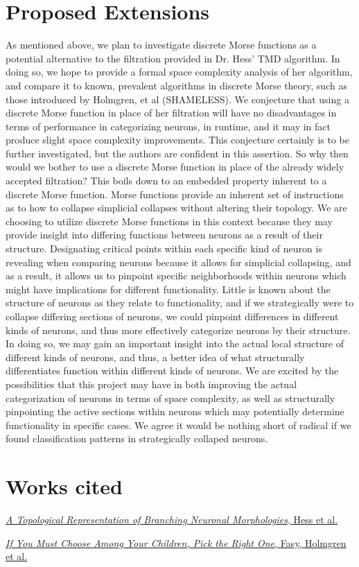 \documentclass[11pt]{article}
\begin{document}
\section*{Proposed Extensions}
As mentioned above, we plan to investigate discrete Morse functions as a potential alternative to the filtration provided in Dr. Hess' TMD algorithm. In doing so, we hope to provide a formal space complexity analysis
of her algorithm, and compare it to known, prevalent algorithms in discrete Morse theory, such as those introduced by Holmgren, et al (SHAMELESS). We conjecture that using a discrete Morse function in place of her filtration will have
no disadvantages in terms of performance in categorizing neurons, in runtime, and it may in fact produce slight space complexity improvements. This conjecture certainly is to be further investigated, but the authors
are confident in this assertion. So why then would we bother to use a discrete Morse function in place of the already widely accepted filtration? This boils down to an embedded property inherent to a discrete Morse 
function. Morse functions provide an inherent set of instructions as to how to collapse simplicial collapses without altering their topology. We are choosing to utilize discrete Morse functions in this context because they 
may provide insight into differing functions between neurons as a result of their structure. Designating critical points within each specific kind of neuron is revealing when comparing neurons because it allows for simplicial 
collapsing, and as a result, it allows us
to pinpoint specific neighborhoods within neurons which might have implications for different functionality. Little is known about the structure of neurons as they relate to functionality, and if we strategically were to collapse differing
sections of neurons, we could pinpoint differences in different kinds of neurons, and thus more effectively categorize neurons by their structure.
In doing so, we may gain an important insight into the actual local structure of different kinds of neurons, and thus, a better
idea of what structurally differentiates function within different kinds of neurons. We are excited by the possibilities that this project may have in both improving the actual categorization of neurons in terms of space complexity,
as well as structurally pinpointing the active sections within neurons which may potentially determine functionality in specific cases. We agree it would be 
nothing short of radical if we found classification patterns in strategically collaped neurons.

\section*{Works cited}
\href{hess.pdf}{\textit{A Topological Representation of Branching Neuronal Morphologies}, Hess et al.}

\href{cccg20.pdf}{\textit{If You Must Choose Among Your Children, Pick the Right One}, Fasy, Holmgren et al.}
\end{document}
